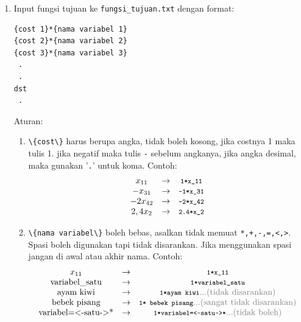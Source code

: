 \documentclass[12pt]{article}
\newcommand{\inline}[1]{\lstinline[basicstyle=\footnotesize\color{black}\ttfamily]|#1|}
\begin{document}
\begin{enumerate}
    \item {
        Input fungsi tujuan ke \inline{fungsi_tujuan.txt} dengan format:
        \begin{lstlisting}
{cost 1}*{nama variabel 1}
{cost 2}*{nama variabel 2}
{cost 3}*{nama variabel 3}
 .
 .
dst
 .
        \end{lstlisting}
        Aturan:
        \begin{enumerate}
            \item {
                \inline{\{cost\}} harus berupa angka, tidak boleh kosong, jika costnya 1 maka tulis 1. jika negatif maka tulis \inline{-} sebelum angkanya, jika angka desimal, maka gunakan '\inline{.}' untuk koma. Contoh:
                \begin{align*}
                    \begin{matrix}
                        x_{11}  & \rightarrow   & \text{\inline{1*x_11}}\\
                        -x_{31} & \rightarrow   & \text{\inline{-1*x_31}}\\
                        -2x_{42}& \rightarrow   & \text{\inline{-2*x_42}}\\
                        2,4x_{2}& \rightarrow   & \text{\inline{2.4*x_2}}
                    \end{matrix}
                \end{align*}
            }
            \item {
                \inline{\{nama variabel\}} boleh bebas, asalkan tidak memuat \inline{*,+,-,=,<,>}. Spasi boleh digunakan tapi tidak disarankan. Jika menggunakan spasi jangan di awal atau akhir nama. Contoh:
                \begin{align*}
                    \begin{matrix}
                        x_{11}  & \rightarrow   & \text{\inline{1*x_11}}\\
                        \text{variabel\_satu}   & \rightarrow   & \text{\inline{1*variabel_satu}}\\
                        \text{ayam kiwi}        & \rightarrow   & \text{\inline{1*ayam kiwi}\textcolor{gray}{...(tidak disarankan)}} \\
                        \text{bebek pisang}     & \rightarrow   & \text{\inline{1* bebek pisang}\textcolor{gray}{...(sangat tidak disarankan)}} \\
                        \text{variabel=<-satu->*}& \rightarrow   & \text{\inline{1*variabel=<-satu->*}\textcolor{gray}{...(tidak boleh)}}

\end{matrix}
\end{align*}}
\end{enumerate}}
\end{enumerate}
\end{document}
